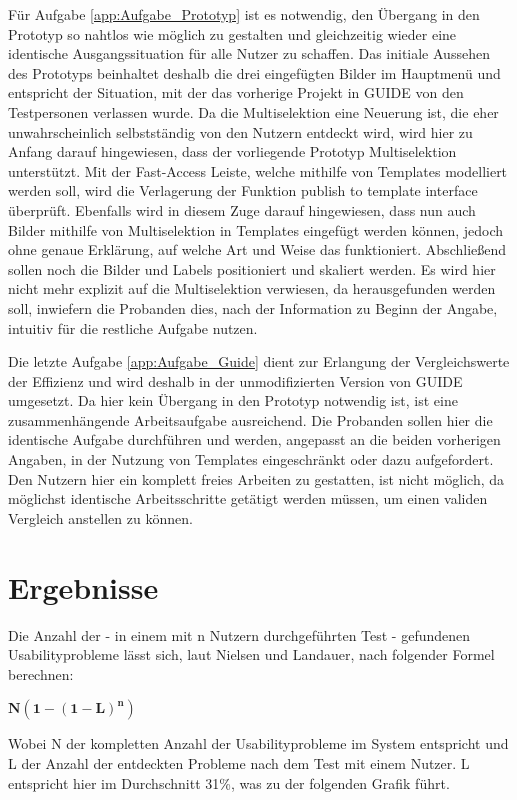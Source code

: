 Für Aufgabe \ref{app:Aufgabe_Prototyp} ist es notwendig, den Übergang in den Prototyp so nahtlos wie möglich zu gestalten und gleichzeitig wieder eine identische Ausgangssituation für alle Nutzer zu schaffen.
Das initiale Aussehen des Prototyps beinhaltet deshalb die drei eingefügten Bilder im Hauptmenü und entspricht der Situation, mit der das vorherige Projekt in GUIDE von den Testpersonen verlassen wurde.
Da die Multiselektion eine Neuerung ist, die eher unwahrscheinlich selbstständig von den Nutzern entdeckt wird, wird hier zu Anfang darauf hingewiesen, dass der vorliegende Prototyp Multiselektion unterstützt.
Mit der Fast-Access Leiste, welche mithilfe von Templates modelliert werden soll, wird die Verlagerung der Funktion \glqq publish to template interface\grqq{} überprüft.
Ebenfalls wird in diesem Zuge darauf hingewiesen, dass nun auch Bilder mithilfe von Multiselektion in Templates eingefügt werden können, jedoch ohne genaue Erklärung, auf welche Art und Weise das funktioniert.
Abschließend sollen noch die Bilder und Labels positioniert und skaliert werden.
Es wird hier nicht mehr explizit auf die Multiselektion verwiesen, da herausgefunden werden soll, inwiefern die Probanden dies, nach der Information zu Beginn der Angabe, intuitiv für die restliche Aufgabe nutzen.

Die letzte Aufgabe \ref{app:Aufgabe_Guide} dient zur Erlangung der Vergleichswerte der Effizienz und wird deshalb in der unmodifizierten Version von GUIDE umgesetzt.
Da hier kein Übergang in den Prototyp notwendig ist, ist eine zusammenhängende Arbeitsaufgabe ausreichend.
Die Probanden sollen hier die identische Aufgabe durchführen und werden, angepasst an die beiden vorherigen Angaben, in der Nutzung von Templates eingeschränkt oder dazu aufgefordert.
Den Nutzern hier ein komplett freies Arbeiten zu gestatten, ist nicht möglich, da möglichst identische Arbeitsschritte getätigt werden müssen, um einen validen Vergleich anstellen zu können.

\section {Ergebnisse}
Die Anzahl der - in einem mit n Nutzern durchgeführten Test -  gefundenen Usabilityprobleme lässt sich, laut Nielsen und Landauer, nach folgender Formel berechnen:

\begin{center}
$\mathbf{N (1-(1- L ) ^n )}$ 
\end{center}

Wobei N der kompletten Anzahl der Usabilityprobleme im System entspricht und L der Anzahl der entdeckten Probleme nach dem Test mit einem Nutzer.
L entspricht hier im Durchschnitt 31\%, was zu der folgenden Grafik führt.  \cite{Nielsen.1993}

